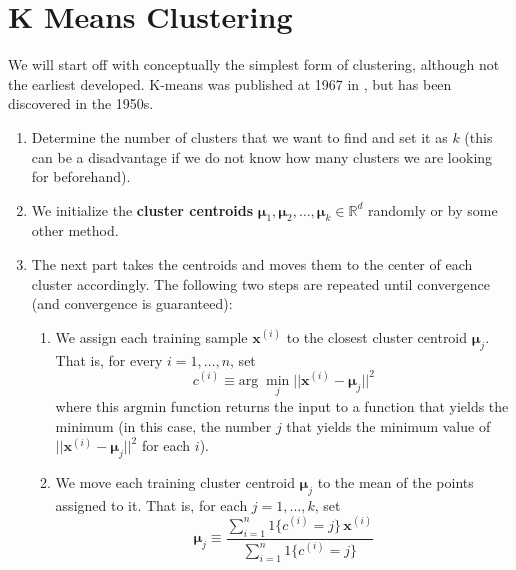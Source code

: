 \section{K Means Clustering} 

  We will start off with conceptually the simplest form of clustering, although not the earliest developed. K-means was published at 1967 in \cite{1967macqueen}, but has been discovered in the 1950s. 

  \begin{enumerate}
    \item Determine the number of clusters that we want to find and set it as $k$ (this can be a disadvantage if we do not know how many clusters we are looking for beforehand).

    \item We initialize the \textbf{cluster centroids} $\boldsymbol{\mu}_1, \boldsymbol{\mu}_2, \ldots, \boldsymbol{\mu}_k \in \mathbb{R}^d$ randomly or by some other method.

    \item The next part takes the centroids and moves them to the center of each cluster accordingly. The following two steps are repeated until convergence (and convergence is guaranteed):
      \begin{enumerate}
        \item We assign each training sample $\mathbf{x}^{(i)}$ to the closest cluster centroid $\boldsymbol{\mu}_j$. That is, for every $i = 1, \ldots, n$, set
          \begin{equation}
            c^{(i)} \equiv \text{arg}\; \min_j || \mathbf{x}^{(i)} - \boldsymbol{\mu}_j ||^2
          \end{equation}
        where this $\text{argmin}$ function returns the input to a function that yields the minimum (in this case, the number $j$ that yields the minimum value of $|| \mathbf{x}^{(i)} - \boldsymbol{\mu}_j ||^2$ for each $i$).

        \item We move each training cluster centroid $\boldsymbol{\mu}_j$ to the mean of the points assigned to it. That is, for each $j = 1, \ldots, k$, set 
          \begin{equation}
            \boldsymbol{\mu}_j \equiv \frac{\sum_{i=1}^n 1\{c^{(i)} = j\}\, \mathbf{x}^{(i)}}{\sum_{i=1}^n 1 \{c^{(i)} = j\}}
          \end{equation}
      \end{enumerate}
  \end{enumerate}

